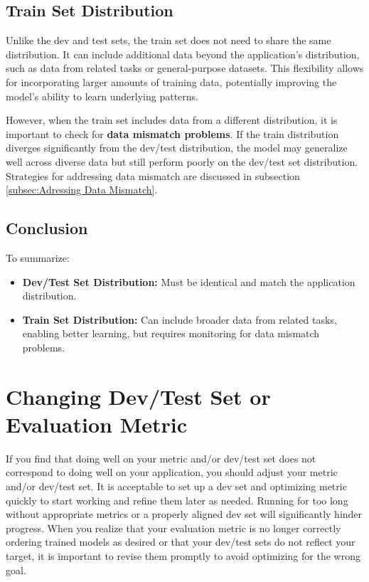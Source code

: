 \documentclass[12pt,openany]{book}
\begin{document}
\subsection{Train Set Distribution}
Unlike the dev and test sets, the train set does not need to share the same distribution. It can include additional data beyond the application’s distribution, such as data from related tasks or general-purpose datasets. This flexibility allows for incorporating larger amounts of training data, potentially improving the model’s ability to learn underlying patterns. \newline

However, when the train set includes data from a different distribution, it is important to check for \textbf{data mismatch problems}. If the train distribution diverges significantly from the dev/test distribution, the model may generalize well across diverse data but still perform poorly on the dev/test set distribution. Strategies for addressing data mismatch are discussed in subsection \ref{subsec:Adressing Data Mismatch}.


\subsection{Conclusion}
To summarize:
\begin{itemize}
    \item \textbf{Dev/Test Set Distribution:} Must be identical and match the application distribution.
    \item \textbf{Train Set Distribution:} Can include broader data from related tasks, enabling better learning, but requires monitoring for data mismatch problems.
\end{itemize}



\section{Changing Dev/Test Set or Evaluation Metric}

If you find that doing well on your metric and/or dev/test set does not correspond to doing well on your application, you should adjust your metric and/or dev/test set. It is acceptable to set up a dev set and optimizing metric quickly to start working and refine them later as needed. Running for too long without appropriate metrics or a properly aligned dev set will significantly hinder progress. When you realize that your evaluation metric is no longer correctly ordering trained models as desired or that your dev/test sets do not reflect your target, it is important to revise them promptly to avoid optimizing for the wrong goal. \newline
\end{document}
